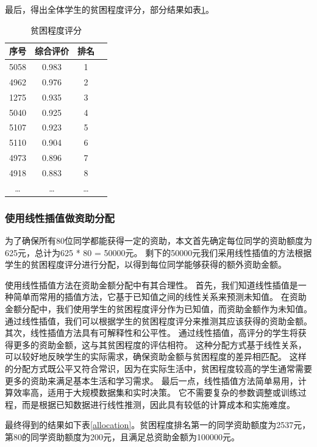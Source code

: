 \documentclass{article}
\begin{document}
最后，得出全体学生的贫困程度评分，部分结果如表\ref{rates}。

\begin{table}[htbp]
  \centering
  \caption{贫困程度评分}
  \label{rates}
  \begin{tabular}{cccc}
    \toprule
    序号  & 综合评价 & 排名 \\
    \midrule
    5058         & 0.983     & 1     \\
    4962         & 0.976     & 2     \\
    1275         & 0.935     & 3     \\
    5040         & 0.925     & 4     \\
    5107         & 0.923     & 5     \\
    5110         & 0.904     & 6     \\
    4973         & 0.896     & 7     \\
    4918         & 0.883     & 8     \\
    \dots        & \dots     & \dots \\
    \bottomrule
  \end{tabular}
\end{table}

\subsubsection{使用线性插值做资助分配}

为了确保所有80位同学都能获得一定的资助，本文首先确定每位同学的资助额度为625元，总计为625 * 80 = 50000元。
剩下的50000元我们采用线性插值的方法根据学生的贫困程度评分进行分配，以得到每位同学能够获得的额外资助金额。

使用线性插值方法在资助金额分配中有其合理性。
首先，我们知道线性插值是一种简单而常用的插值方法，它基于已知值之间的线性关系来预测未知值。
在资助金额分配中，我们使用学生的贫困程度评分作为已知值，而资助金额作为未知值。
通过线性插值，我们可以根据学生的贫困程度评分来推测其应该获得的资助金额。
其次，线性插值方法具有可解释性和公平性。
通过线性插值，高评分的学生将获得更多的资助金额，这与其贫困程度的评估相符。
这种分配方式基于线性关系，可以较好地反映学生的实际需求，确保资助金额与贫困程度的差异相匹配。
这样的分配方式既公平又符合常识，因为在实际生活中，贫困程度较高的学生通常需要更多的资助来满足基本生活和学习需求。
最后一点，线性插值方法简单易用，计算效率高，适用于大规模数据集和实时决策。
它不需要复杂的参数调整或训练过程，而是根据已知数据进行线性推测，因此具有较低的计算成本和实施难度。

最终得到的结果如下表\ref{allocation}。贫困程度排名第一的同学资助额度为2537元，第80的同学资助额度为200元，且满足总资助金额为100000元。
\end{document}
